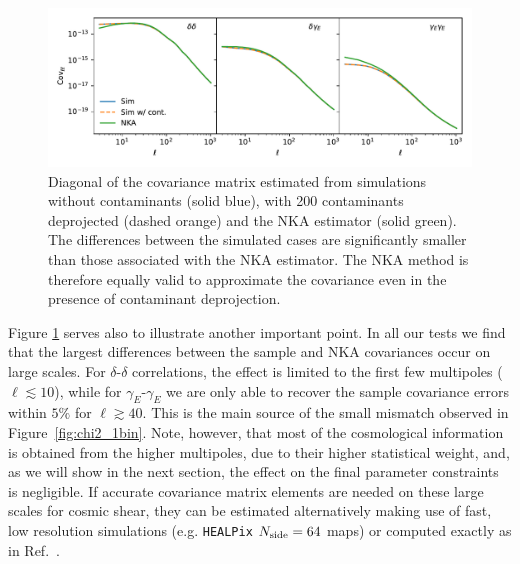 \documentclass[a4paper,11pt]{article}
\newcommand{\cgg}[1]{{\color{olive} #1}}
\begin{document}
      \begin{figure}
        \centering
        \includegraphics[width=\textwidth]{./figures/contaminants_diag_cov.pdf}
        \caption{Diagonal of the covariance matrix estimated from simulations without contaminants (solid blue), with 200 contaminants deprojected (dashed orange) and the NKA estimator (solid green). The differences between the simulated cases are significantly smaller than those associated with the NKA estimator. The NKA method is therefore equally valid to approximate the covariance even in the presence of contaminant deprojection.}
        \label{fig:diag_conts}
      \end{figure}
      Figure \ref{fig:diag_conts} serves also to illustrate another important
      point. In all our tests we find that the largest differences between the
      sample and NKA covariances occur on large scales. For $\delta$-$\delta$
      correlations, the effect is limited to the first few multipoles
      ($\ell\lesssim10$), while for $\gamma_E$-$\gamma_E$ we are only able to
      recover the sample covariance errors within $5\%$ for $\ell\gtrsim40$.
      This is the main source of the small mismatch observed in
      Figure~\ref{fig:chi2_1bin}. Note, however, that most of the cosmological
      information is obtained from the higher multipoles, due to their higher
      statistical weight, and, as we will show in the next section, the effect
      on the final parameter constraints is negligible. If accurate
      \cgg{covariance matrix elements} are needed on these large scales for cosmic shear, they
      can be estimated alternatively making use of fast, low resolution
      simulations (e.g. {\tt HEALPix} $N_{\rm side}=64$ maps) \cgg{or computed
      exactly as in Ref.~\cite{Efstathiou:2006eb,2017A&A...602A..41C}}.
\end{document}
